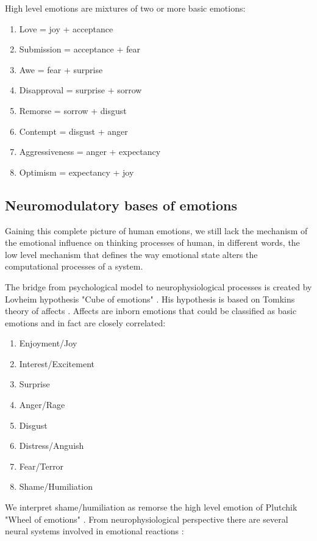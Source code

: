 High level emotions are mixtures of two or more basic emotions:

\begin{enumerate}
 \item  Love = joy + acceptance
 \item  Submission = acceptance + fear
 \item  Awe = fear + surprise
 \item  Disapproval = surprise + sorrow
 \item  Remorse = sorrow + disgust
 \item  Contempt = disgust + anger
 \item  Aggressiveness = anger + expectancy
 \item  Optimism = expectancy + joy
\end{enumerate}

\subsection{Neuromodulatory bases of emotions}

Gaining this complete picture of human emotions, we still lack the mechanism of the emotional influence on thinking processes of human, in different words, the low level mechanism that defines the way emotional state alters the computational processes of a system.

The bridge from psychological model to neurophysiological processes is created by Lovheim hypothesis "Cube of emotions" \cite{cubeofemotions}. His hypothesis is based on Tomkins theory of affects \cite{tomkins1, tomkins2, tomkins3, quest, primer_affect_psychology}. Affects are inborn emotions that could be classified as basic emotions and in fact are closely correlated:

\begin{enumerate}
 \item  Enjoyment/Joy
 \item  Interest/Excitement
 \item  Surprise
 \item  Anger/Rage
 \item  Disgust
 \item  Distress/Anguish
 \item  Fear/Terror
 \item  Shame/Humiliation
\end{enumerate}

We interpret shame/humiliation as remorse the high level emotion of  Plutchik "Wheel of emotions" \cite{natureofemotions}. From neurophysiological perspective there are several neural systems involved in emotional reactions \cite{emotionsbraintorobot, neuromodulatory}:

